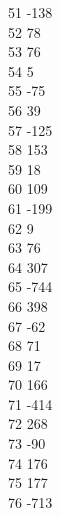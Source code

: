 { 51	-138 \\
 52	78 \\
 53	76 \\
 54	5 \\
 55	-75 \\
 56	39 \\
 57	-125 \\
 58	153 \\
 59	18 \\
 60	109 \\
 61	-199 \\
 62	9 \\
 63	76 \\
 64	307 \\
 65	-744 \\
 66	398 \\
 67	-62 \\
 68	71 \\
 69	17 \\
 70	166 \\
 71	-414 \\
 72	268 \\
 73	-90 \\
 74	176 \\
 75	177 \\
 76	-713 \\
}

